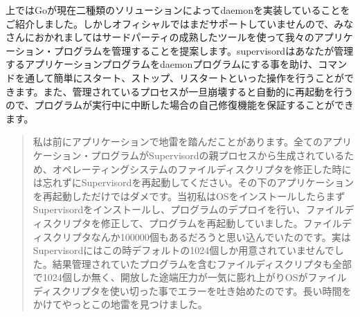 上ではGoが現在二種類のソリューションによってdaemonを実装していることをご紹介しました。しかしオフィシャルではまだサポートしていませんので、みなさんにおかれましてはサードパーティの成熟したツールを使って我々のアプリケーション・プログラムを管理することを提案します。supervisordはあなたが管理するアプリケーションプログラムをdaemonプログラムにする事を助け、コマンドを通して簡単にスタート、ストップ、リスタートといった操作を行うことができます。また、管理されているプロセスが一旦崩壊すると自動的に再起動を行うので、プログラムが実行中に中断した場合の自己修復機能を保証することができます。

\begin{quote}
私は前にアプリケーションで地雷を踏んだことがあります。全てのアプリケーション・プログラムがSupervisordの親プロセスから生成されているため、オペレーティングシステムのファイルディスクリプタを修正した時には忘れずにSupervisordを再起動してください。その下のアプリケーションを再起動しただけではダメです。当初私はOSをインストールしたらまずSupervisordをインストールし、プログラムのデプロイを行い、ファイルディスクリプタを修正して、プログラムを再起動していました。ファイルディスクリプタなんか100000個もあるだろうと思い込んでいたのです。実はSupervisordにはこの時デフォルトの1024個しか用意されていませんでした。結果管理されていたプログラムを含むファイルディスクリプタも全部で1024個しか無く、開放した途端圧力が一気に膨れ上がりOSがファイルディスクリプタを使い切った事でエラーを吐き始めたのです。長い時間をかけてやっとこの地雷を見つけました。
\end{quote}
